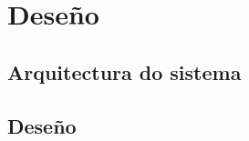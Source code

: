 %
%
\chapter[Deseño]{
	Deseño
	\label{ch.dsn}
}


%
%
\section[Arquitectura Global do Sistema]{
	Arquitectura do sistema}

\section[Deseño]{
	Deseño}